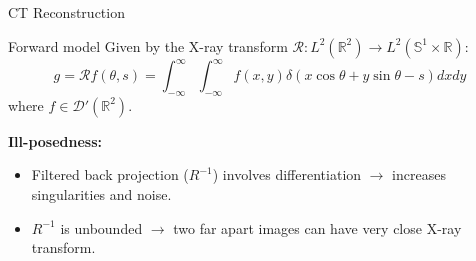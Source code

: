 \begin{frame}{CT Reconstruction}

\begin{block}{Forward model}
Given by the X-ray transform $\mathcal{R}: L^2(\mathbb{R}^2)\longrightarrow L^2(\mathbb{S}^1\times\mathbb{R})$:
$$
g = \mathcal{R}f(\theta,s)= \int_{-\infty}^{\infty}\int_{-\infty}^{\infty}f(x,y)\delta(x\cos\theta+y\sin\theta-s)dxdy
$$
where $f\in \mathcal{D}'(\mathbb{R}^2)$.
\end{block}

\pause
\bigskip

\textbf{Ill-posedness:}    
\begin{itemize}
\item Filtered back projection ($R^{-1}$) involves differentiation $\longrightarrow$ increases singularities and noise.
 
\item $R^{-1}$ is unbounded $\longrightarrow$ two far apart images can have very close X-ray transform.
\end{itemize}
\end{frame}


